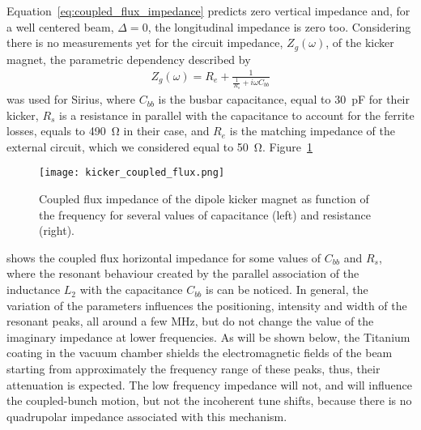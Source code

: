     Equation~\eqref{eq:coupled_flux_impedance} predicts zero vertical impedance and, for a well centered beam, $\Delta=0$, the longitudinal impedance is zero too. Considering there is no measurements yet for the circuit impedance, $Z_g(\omega)$, of the kicker magnet, the parametric dependency described by~
    \begin{align}
        Z_g(\omega) = R_e + \frac{1}{\frac{1}{R_s}+i\omega C_{bb}}
    \end{align}
    was used for Sirius, where $C_{bb}$ is the busbar capacitance, equal to \SI{30}{\pico\farad} for their kicker, $R_s$ is a resistance in parallel with the capacitance to account for the ferrite losses, equals to \SI{490}{\ohm} in their case, and $R_e$ is the matching impedance of the external circuit, which we considered equal to \SI{50}{\ohm}. Figure~\ref{fig:coupled_flux_impedance}
    \begin{figure}
        \centering
        \texttt{[image: kicker\_coupled\_flux.png]}
        \caption{Coupled flux impedance of the dipole kicker magnet as function of the frequency for several values of capacitance (left) and resistance (right).}
        \label{fig:coupled_flux_impedance}
    \end{figure}
    shows the coupled flux horizontal impedance for some values of $C_{bb}$ and $R_s$, where the resonant behaviour created by the parallel association of the inductance $L_2$ with the capacitance $C_{bb}$ is can be noticed. In general, the variation of the parameters influences the positioning, intensity and width of the resonant peaks, all around a few \si{\mega\hertz}, but do not change the value of the imaginary impedance at lower frequencies. As will be shown below, the Titanium coating in the vacuum chamber shields the electromagnetic fields of the beam starting from approximately the frequency range of these peaks, thus, their attenuation is expected. The low frequency impedance will not, and will influence the coupled-bunch motion, but not the incoherent tune shifts, because there is no quadrupolar impedance associated with this mechanism.

